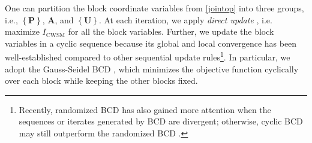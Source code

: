 \documentclass[10pt,journal]{IEEEtran}
\newcommand{\paren}[1]{\left({#1}\right)}
\newcommand{\braces}[1]{{\left\{ {#1}\right\}}}
\theoremstyle{definition}
\begin{document}

	
	One can partition the block coordinate variables from \eqref{jointop} into three groups, i.e., $\braces{\mathbf{P}}$, $\mathbf{A}$, and $\braces{\mathbf{U}}$. %
	At each iteration, we apply \textit{direct update} \cite{BCDconvergence}, i.e. maximize %
	$I_{\textrm{CWSM}}$ for all the block variables. %
	Further, we update the block variables in a cyclic sequence because its global and local convergence has been well-established \cite{BCDconvergence,Lops2019serveillance} 
	compared to other sequential update rules\footnote{Recently, randomized BCD has also gained more attention when the sequences or iterates generated by BCD are divergent; otherwise, cyclic BCD may still outperform the randomized BCD \cite{ADMMBCD}.}. In particular, we adopt the Gauss-Seidel BCD \cite{BCDconvergence}, which minimizes the objective function cyclically over each block while keeping the other blocks fixed. 
	
\end{document}
